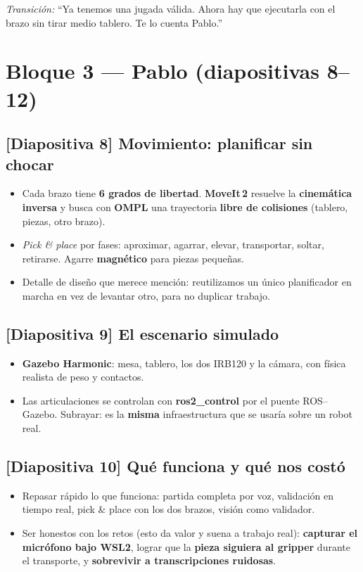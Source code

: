 \documentclass[11pt]{article}
\newcommand{\slide}[1]{\textbf{\color{azul}[Diapositiva #1]}}
\newcommand{\transicion}[1]{\par\smallskip\noindent\textit{\color{gris}Transición:} #1}
\begin{document}
\transicion{``Ya tenemos una jugada válida. Ahora hay que ejecutarla con el
brazo sin tirar medio tablero. Te lo cuenta Pablo.''}

\bigskip
\section{Bloque 3 --- Pablo (diapositivas 8--12)}

\subsection{\slide{8} Movimiento: planificar sin chocar}
\begin{itemize}
    \item Cada brazo tiene \textbf{6 grados de libertad}. \textbf{MoveIt\,2}
          resuelve la \textbf{cinemática inversa} y busca con \textbf{OMPL} una
          trayectoria \textbf{libre de colisiones} (tablero, piezas, otro brazo).
    \item \textit{Pick \& place} por fases: aproximar, agarrar, elevar,
          transportar, soltar, retirarse. Agarre \textbf{magnético} para piezas
          pequeñas.
    \item Detalle de diseño que merece mención: reutilizamos un único
          planificador en marcha en vez de levantar otro, para no duplicar trabajo.
\end{itemize}

\subsection{\slide{9} El escenario simulado}
\begin{itemize}
    \item \textbf{Gazebo Harmonic}: mesa, tablero, los dos IRB120 y la cámara,
          con física realista de peso y contactos.
    \item Las articulaciones se controlan con \textbf{ros2\_control} por el
          puente ROS--Gazebo. Subrayar: es la \textbf{misma} infraestructura que
          se usaría sobre un robot real.
\end{itemize}

\subsection{\slide{10} Qué funciona y qué nos costó}
\begin{itemize}
    \item Repasar rápido lo que funciona: partida completa por voz, validación
          en tiempo real, pick \& place con los dos brazos, visión como validador.
    \item Ser honestos con los retos (esto da valor y suena a trabajo real):
          \textbf{capturar el micrófono bajo WSL2}, lograr que la \textbf{pieza
          siguiera al gripper} durante el transporte, y \textbf{sobrevivir a
          transcripciones ruidosas}.
\end{itemize}
\end{document}
